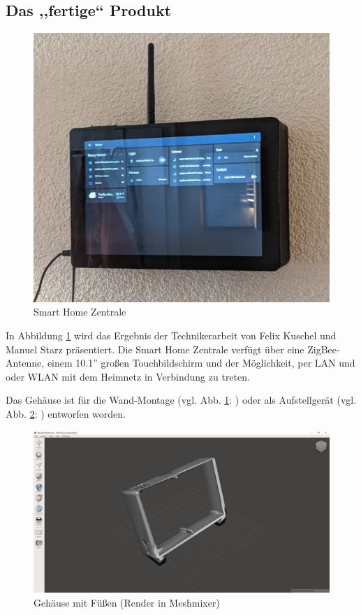 \subsection{Das ,,fertige`` Produkt}\label{ku_produkt}
\begin{figure}[H]
	\includegraphics[width=1\textwidth]{img/fertiges_geraet.png}
	\caption[Smart Home Zentrale]{Smart Home Zentrale}
	\label{fig:smart-home-zentrale}
\end{figure}
\noindent In Abbildung \ref{fig:smart-home-zentrale} wird das Ergebnis der Technikerarbeit von Felix Kuschel und Manuel Starz präsentiert. 
Die Smart Home Zentrale verfügt über eine ZigBee-Antenne, einem 10.1'' großen Touchbildschirm und der Möglichkeit, per LAN und oder WLAN mit dem Heimnetz in Verbindung zu treten.\par
\noindent Das Gehäuse ist für die Wand-Montage (vgl. Abb. \ref{fig:smart-home-zentrale}: ) oder als Aufstellgerät (vgl. Abb. \ref{fig:case-with-feet}: ) entworfen worden.
\begin{figure}[H]
	\includegraphics[width=1\textwidth]{img/stand_case.png}
	\caption[Gehäuse mit Füßen (Render in Meshmixer)]{Gehäuse mit Füßen (Render in Meshmixer)}
	\label{fig:case-with-feet}
\end{figure}